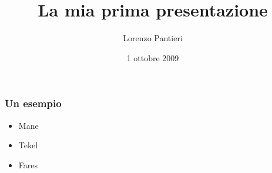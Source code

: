 \documentclass{beamer}
\title{La mia prima presentazione}
\author{Lorenzo Pantieri}
\date{1 ottobre 2009}
\begin{document}
\begin{frame}
    \maketitle
\end{frame}
\begin{frame}
    \frametitle{Un esempio}
    \begin{itemize}
        \item<1-> Mane
        \item<2-> Tekel
        \item<3-> Fares
    \end{itemize}
\end{frame}
\end{document}
